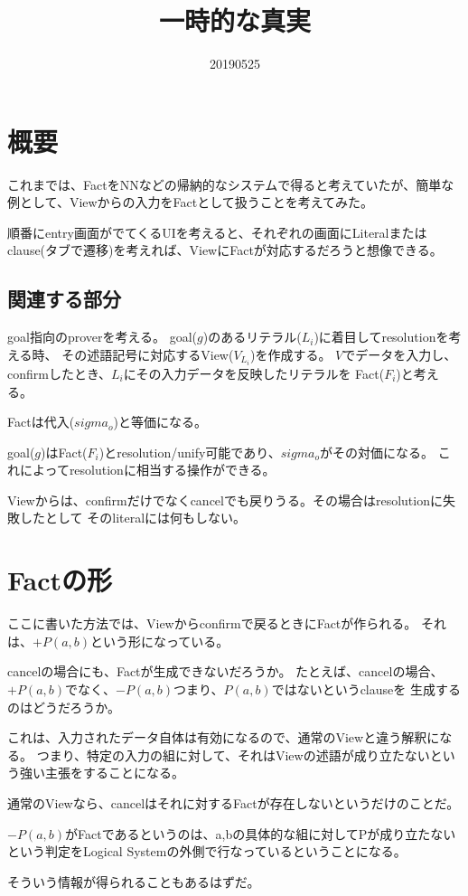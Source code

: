 \documentclass[10pt, onecolumn]{jarticle}   	%
\title{一時的な真実}
\author{\myname}
\date{20190525}					%
\begin{document}
\maketitle

\section{概要}

これまでは、FactをNNなどの帰納的なシステムで得ると考えていたが、簡単な例として、Viewからの入力をFactとして扱うことを考えてみた。

順番にentry画面がでてくるUIを考えると、それぞれの画面にLiteralまたはclause(タブで遷移)を考えれば、ViewにFactが対応するだろうと想像できる。

\subsection{関連する部分}
goal指向のproverを考える。
goal($g$)のあるリテラル($L_i$)に着目してresolutionを考える時、
その述語記号に対応するView($V_{L_i}$)を作成する。
$V$でデータを入力し、confirmしたとき、$L_i$にその入力データを反映したリテラルを
Fact($F_i$)と考える。

Factは代入($sigma_o$)と等価になる。

goal($g$)はFact($F_i$)とresolution/unify可能であり、$sigma_o$がその対価になる。
これによってresolutionに相当する操作ができる。

Viewからは、confirmだけでなくcancelでも戻りうる。その場合はresolutionに失敗したとして
そのliteralには何もしない。


%



\section{Factの形}
ここに書いた方法では、Viewからconfirmで戻るときにFactが作られる。
それは、$+P(a,b)$という形になっている。

cancelの場合にも、Factが生成できないだろうか。
たとえば、cancelの場合、$+P(a,b)$でなく、$-P(a,b)$つまり、$P(a,b)$ではないというclauseを
生成するのはどうだろうか。

これは、入力されたデータ自体は有効になるので、通常のViewと違う解釈になる。
つまり、特定の入力の組に対して、それはViewの述語が成り立たないという強い主張をすることになる。

通常のViewなら、cancelはそれに対するFactが存在しないというだけのことだ。

$-P(a,b)$がFactであるというのは、a,bの具体的な組に対してPが成り立たないという判定をLogical Systemの外側で行なっているということになる。

そういう情報が得られることもあるはずだ。
\end{document}
